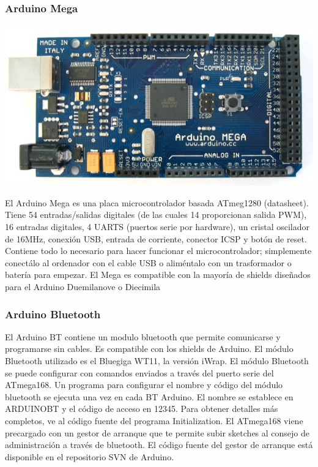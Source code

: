 \documentclass[12pt,a4papert,woside,openright,titlepage,final]{book}
\begin{document}
\subsubsection{Arduino Mega}

\includegraphics[scale=0.6]{ArduinoMega.jpg}

El Arduino Mega es una placa microcontrolador basada ATmeg1280 (datasheet). Tiene 54 entradas/salidas digitales (de las cuales 14 proporcionan salida PWM), 16 entradas digitales, 4 UARTS (puertos serie por hardware), un cristal oscilador de 16MHz, conexión USB, entrada de corriente, conector ICSP y botón de reset. Contiene todo lo necesario para hacer funcionar el microcontrolador; simplemente conectálo al ordenador con el cable USB o aliméntalo con un trasformador o batería para empezar. El Mega es compatible con la mayoría de shields diseñados para el Arduino Duemilanove o Diecimila

\subsubsection{Arduino Bluetooth}

El Arduino BT contiene un modulo bluetooth que permite comunicarse y programarse
sin cables. Es compatible con los shields de Arduino. 
El módulo Bluetooth utilizado es el Bluegiga WT11, la versión iWrap. El módulo
Bluetooth se puede configurar con comandos enviados a través del puerto serie
del ATmega168. Un programa para configurar el nombre y código del módulo
bluetooth se ejecuta una vez en cada BT Arduino. El nombre se establece en
ARDUINOBT y el código de acceso en 12345. Para obtener detalles más completos,
ve al código fuente del programa Initialization. El ATmega168 viene precargado
con un gestor de arranque que te permite subir sketches al consejo de
administración a través de bluetooth. El código fuente del gestor de arranque
está disponible en el repositorio SVN de Arduino.
\end{document}
